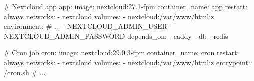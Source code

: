 \documentclass[xcolor=table,fontsize=10pt]{beamer}
\begin{document}
\begin{frame}[fragile]
{\begin{minipage}{0.55\textwidth}
\begin{adjustbox}{max width=\textwidth}
\begin{tikzpicture}
	\end{tikzpicture}
\end{adjustbox}

\end{minipage}
\begin{minipage}{0.4\textwidth}

\begin{yaml}
  # Nextcloud app
  app:
    image: nextcloud:27.1-fpm
    container_name: app
    restart: always
    networks:
      - nextcloud
    volumes:
      - nextcloud:/var/www/html:z
    environment:
			# $\dots$
      - NEXTCLOUD_ADMIN_USER
      - NEXTCLOUD_ADMIN_PASSWORD
    depends_on:
      - caddy
      - db
      - redis
\end{yaml}

\begin{yaml}
  # Cron job
  cron:
    image: nextcloud:29.0.3-fpm
    container_name: cron
    restart: always
    networks:
      - nextcloud
    volumes:
      - nextcloud:/var/www/html:z
    entrypoint: /cron.sh
		# $\dots$
\end{yaml}

\end{minipage}

	}
\end{frame}
\end{document}
